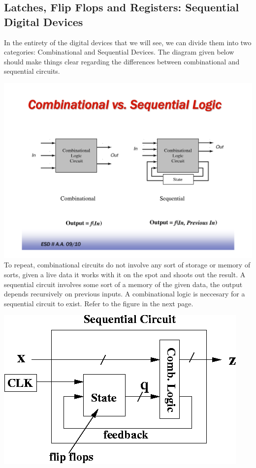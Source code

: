 \documentclass[11pt]{article}
\begin{document}
\subsection{Latches, Flip Flops and Registers: Sequential Digital Devices}
In the entirety of the digital devices that we will see, we can divide them into two categories: Combinational and Sequential Devices. The diagram given below should make things clear regarding the differences between combinational and sequential circuits. 

\includegraphics[scale=0.50]{cscir.png}
To repeat, combinational circuits do not involve any sort of storage or memory of sorts, given a live data it works with it on the spot and shoots out the result. A sequential circuit involves some sort of a memory of the given data, the output depends recursively on previous inputs. A combinational logic is neccesary for a sequential circuit to exist. Refer to the figure in the next page.

\includegraphics[scale=0.50]{seq.png}
\end{document}
